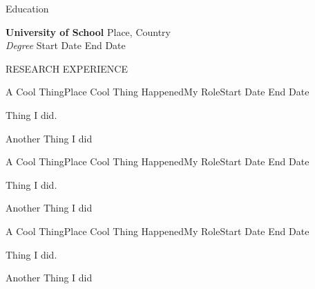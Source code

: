 \documentclass{resume} %
\begin{document}



\begin{rSection}{Education}

{\bf \large  University of School} \hfill {Place, Country}\\
{\em Degree} \hfill { Start Date {\textendash}  End Date }

\end{rSection}



\begin{rSection}{RESEARCH EXPERIENCE}



\begin{rSubsection}{A Cool Thing}{Place Cool Thing Happened}{My Role}{Start Date {\textendash} End Date}
\item Thing I did.
\item Another Thing I did
\end{rSubsection}


\begin{rSubsection}{A Cool Thing}{Place Cool Thing Happened}{My Role}{Start Date {\textendash} End Date}
\item Thing I did.
\item Another Thing I did
\end{rSubsection}

\begin{rSubsection}{A Cool Thing}{Place Cool Thing Happened}{My Role}{Start Date {\textendash} End Date}
\item Thing I did.
\item Another Thing I did
\end{rSubsection}


\end{rSection}
\end{document}
